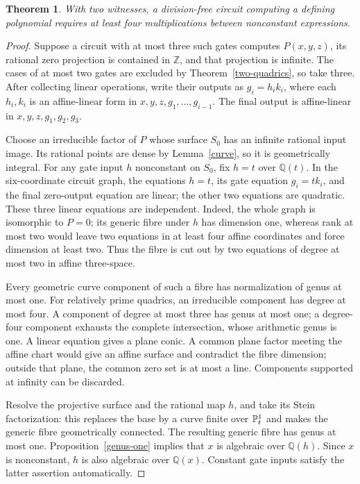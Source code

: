 \documentclass[11pt]{article}
\newtheorem{theorem}{Theorem}[section]
\theoremstyle{remark}\newtheorem{remark}[theorem]{Remark}
\newcommand{\Q}{\mathbb Q}\newcommand{\Z}{\mathbb Z}\newcommand{\R}{\mathbb R}
\begin{document}
\begin{theorem}\label{four-multiplications}
With two witnesses, a division-free circuit computing a defining polynomial requires at least four multiplications between nonconstant expressions.
\end{theorem}
\begin{proof}
Suppose a circuit with at most three such gates computes \(P(x,y,z)\), its rational zero projection is contained in \(\Z\), and that projection is infinite. The cases of at most two gates are excluded by Theorem~\ref{two-quadrics}, so take three. After collecting linear operations, write their outputs as \(g_i=h_i k_i\), where each \(h_i,k_i\) is an affine-linear form in \(x,y,z,g_1,\ldots,g_{i-1}\). The final output is affine-linear in \(x,y,z,g_1,g_2,g_3\).

Choose an irreducible factor of \(P\) whose surface \(S_0\) has an infinite rational input image. Its rational points are dense by Lemma~\ref{curve}, so it is geometrically integral. For any gate input \(h\) nonconstant on \(S_0\), fix \(h=t\) over \(\Q(t)\). In the six-coordinate circuit graph, the equations \(h=t\), its gate equation \(g_i=tk_i\), and the final zero-output equation are linear; the other two equations are quadratic. These three linear equations are independent. Indeed, the whole graph is isomorphic to \(P=0\); its generic fibre under \(h\) has dimension one, whereas rank at most two would leave two equations in at least four affine coordinates and force dimension at least two. Thus the fibre is cut out by two equations of degree at most two in affine three-space.

Every geometric curve component of such a fibre has normalization of genus at most one. For relatively prime quadrics, an irreducible component has degree at most four. A component of degree at most three has genus at most one; a degree-four component exhausts the complete intersection, whose arithmetic genus is one. A linear equation gives a plane conic. A common plane factor meeting the affine chart would give an affine surface and contradict the fibre dimension; outside that plane, the common zero set is at most a line. Components supported at infinity can be discarded.

Resolve the projective surface and the rational map \(h\), and take its Stein factorization: this replaces the base by a curve finite over \(\mathbb P^1_t\) and makes the generic fibre geometrically connected. The resulting generic fibre has genus at most one. Proposition~\ref{genus-one} implies that \(x\) is algebraic over \(\Q(h)\). Since \(x\) is nonconstant, \(h\) is also algebraic over \(\Q(x)\). Constant gate inputs satisfy the latter assertion automatically.


\end{proof}
\end{document}
